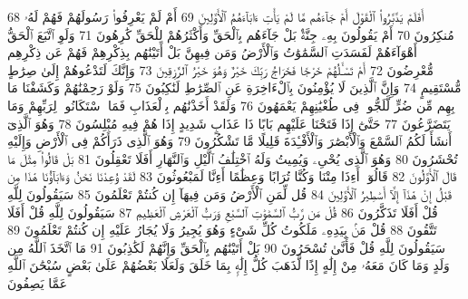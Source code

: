 {\tiny\colorbox{cl_aya}{68}} أَفَلَمْ يَدَّبَّرُوا۟ ٱلْقَوْلَ أَمْ جَآءَهُم مَّا لَمْ يَأْتِ ءَابَآءَهُمُ ٱلْأَوَّلِينَ
{\tiny\colorbox{cl_aya}{69}} أَمْ لَمْ يَعْرِفُوا۟ رَسُولَهُمْ فَهُمْ لَهُۥ مُنكِرُونَ
{\tiny\colorbox{cl_aya}{70}} أَمْ يَقُولُونَ بِهِۦ جِنَّةٌۢ بَلْ جَآءَهُم بِٱلْحَقِّ وَأَكْثَرُهُمْ لِلْحَقِّ كَٰرِهُونَ
{\tiny\colorbox{cl_aya}{71}} وَلَوِ ٱتَّبَعَ ٱلْحَقُّ أَهْوَآءَهُمْ لَفَسَدَتِ ٱلسَّمَٰوَٰتُ وَٱلْأَرْضُ وَمَن فِيهِنَّ بَلْ أَتَيْنَٰهُم بِذِكْرِهِمْ فَهُمْ عَن ذِكْرِهِم مُّعْرِضُونَ
{\tiny\colorbox{cl_aya}{72}} أَمْ تَسْـَٔلُهُمْ خَرْجًا فَخَرَاجُ رَبِّكَ خَيْرٌ وَهُوَ خَيْرُ ٱلرَّٰزِقِينَ
{\tiny\colorbox{cl_aya}{73}} وَإِنَّكَ لَتَدْعُوهُمْ إِلَىٰ صِرَٰطٍ مُّسْتَقِيمٍ
{\tiny\colorbox{cl_aya}{74}} وَإِنَّ ٱلَّذِينَ لَا يُؤْمِنُونَ بِٱلْءَاخِرَةِ عَنِ ٱلصِّرَٰطِ لَنَٰكِبُونَ
{\tiny\colorbox{cl_aya}{75}} وَلَوْ رَحِمْنَٰهُمْ وَكَشَفْنَا مَا بِهِم مِّن ضُرٍّ لَّلَجُّوا۟ فِى طُغْيَٰنِهِمْ يَعْمَهُونَ
{\tiny\colorbox{cl_aya}{76}} وَلَقَدْ أَخَذْنَٰهُم بِٱلْعَذَابِ فَمَا ٱسْتَكَانُوا۟ لِرَبِّهِمْ وَمَا يَتَضَرَّعُونَ
{\tiny\colorbox{cl_aya}{77}} حَتَّىٰٓ إِذَا فَتَحْنَا عَلَيْهِم بَابًا ذَا عَذَابٍ شَدِيدٍ إِذَا هُمْ فِيهِ مُبْلِسُونَ
{\tiny\colorbox{cl_aya}{78}} وَهُوَ ٱلَّذِىٓ أَنشَأَ لَكُمُ ٱلسَّمْعَ وَٱلْأَبْصَٰرَ وَٱلْأَفْـِٔدَةَ قَلِيلًا مَّا تَشْكُرُونَ
{\tiny\colorbox{cl_aya}{79}} وَهُوَ ٱلَّذِى ذَرَأَكُمْ فِى ٱلْأَرْضِ وَإِلَيْهِ تُحْشَرُونَ
{\tiny\colorbox{cl_aya}{80}} وَهُوَ ٱلَّذِى يُحْىِۦ وَيُمِيتُ وَلَهُ ٱخْتِلَٰفُ ٱلَّيْلِ وَٱلنَّهَارِ أَفَلَا تَعْقِلُونَ
{\tiny\colorbox{cl_aya}{81}} بَلْ قَالُوا۟ مِثْلَ مَا قَالَ ٱلْأَوَّلُونَ
{\tiny\colorbox{cl_aya}{82}} قَالُوٓا۟ أَءِذَا مِتْنَا وَكُنَّا تُرَابًا وَعِظَٰمًا أَءِنَّا لَمَبْعُوثُونَ
{\tiny\colorbox{cl_aya}{83}} لَقَدْ وُعِدْنَا نَحْنُ وَءَابَآؤُنَا هَٰذَا مِن قَبْلُ إِنْ هَٰذَآ إِلَّآ أَسَٰطِيرُ ٱلْأَوَّلِينَ
{\tiny\colorbox{cl_aya}{84}} قُل لِّمَنِ ٱلْأَرْضُ وَمَن فِيهَآ إِن كُنتُمْ تَعْلَمُونَ
{\tiny\colorbox{cl_aya}{85}} سَيَقُولُونَ لِلَّهِ قُلْ أَفَلَا تَذَكَّرُونَ
{\tiny\colorbox{cl_aya}{86}} قُلْ مَن رَّبُّ ٱلسَّمَٰوَٰتِ ٱلسَّبْعِ وَرَبُّ ٱلْعَرْشِ ٱلْعَظِيمِ
{\tiny\colorbox{cl_aya}{87}} سَيَقُولُونَ لِلَّهِ قُلْ أَفَلَا تَتَّقُونَ
{\tiny\colorbox{cl_aya}{88}} قُلْ مَنۢ بِيَدِهِۦ مَلَكُوتُ كُلِّ شَىْءٍ وَهُوَ يُجِيرُ وَلَا يُجَارُ عَلَيْهِ إِن كُنتُمْ تَعْلَمُونَ
{\tiny\colorbox{cl_aya}{89}} سَيَقُولُونَ لِلَّهِ قُلْ فَأَنَّىٰ تُسْحَرُونَ
{\tiny\colorbox{cl_aya}{90}} بَلْ أَتَيْنَٰهُم بِٱلْحَقِّ وَإِنَّهُمْ لَكَٰذِبُونَ
{\tiny\colorbox{cl_aya}{91}} مَا ٱتَّخَذَ ٱللَّهُ مِن وَلَدٍ وَمَا كَانَ مَعَهُۥ مِنْ إِلَٰهٍ إِذًا لَّذَهَبَ كُلُّ إِلَٰهٍۭ بِمَا خَلَقَ وَلَعَلَا بَعْضُهُمْ عَلَىٰ بَعْضٍ سُبْحَٰنَ ٱللَّهِ عَمَّا يَصِفُونَ
